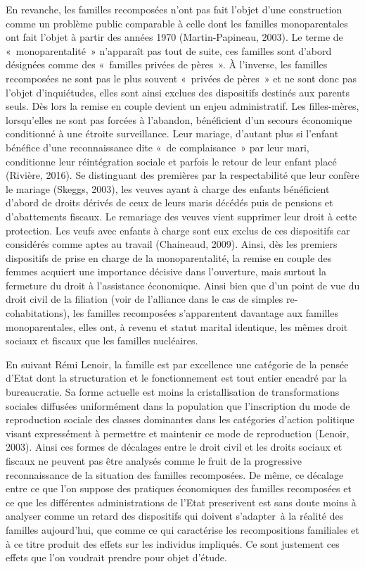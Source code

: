 \documentclass[
  12pt,
]{book}
\begin{document}
En revanche, les familles recomposées n'ont pas fait l'objet d'une
construction comme un problème public comparable à celle dont les
familles monoparentales ont fait l'objet à partir des années 1970
(Martin-Papineau, 2003). Le terme de «~monoparentalité~» n'apparaît pas
tout de suite, ces familles sont d'abord désignées comme des «~familles
privées de pères~». À l'inverse, les familles recomposées ne sont pas le
plus souvent «~privées de pères~» et ne sont donc pas l'objet
d'inquiétudes, elles sont ainsi exclues des dispositifs destinés aux
parents seuls. Dès lors la remise en couple devient un enjeu
administratif. Les filles-mères, lorsqu'elles ne sont pas forcées à
l'abandon, bénéficient d'un secours économique conditionné à une étroite
surveillance. Leur mariage, d'autant plus si l'enfant bénéfice d'une
reconnaissance dite «~de complaisance~» par leur mari, conditionne leur
réintégration sociale et parfois le retour de leur enfant placé
(Rivière, 2016). Se distinguant des premières par la respectabilité que
leur confère le mariage (Skeggs, 2003), les veuves ayant à charge des
enfants bénéficient d'abord de droits dérivés de ceux de leurs maris
décédés puis de pensions et d'abattements fiscaux. Le remariage des
veuves vient supprimer leur droit à cette protection. Les veufs avec
enfants à charge sont eux exclus de ces dispositifs car considérés comme
aptes au travail (Chaineaud, 2009). Ainsi, dès les premiers dispositifs
de prise en charge de la monoparentalité, la remise en couple des femmes
acquiert une importance décisive dans l'ouverture, mais surtout la
fermeture du droit à l'assistance économique. Ainsi bien que d'un point
de vue du droit civil de la filiation (voir de l'alliance dans le cas de
simples re-cohabitations), les familles recomposées s'apparentent
davantage aux familles monoparentales, elles ont, à revenu et statut
marital identique, les mêmes droit sociaux et fiscaux que les familles
nucléaires.

En suivant Rémi Lenoir, la famille est par excellence une catégorie de
la pensée d'Etat dont la structuration et le fonctionnement est tout
entier encadré par la bureaucratie. Sa forme actuelle est moins la
cristallisation de transformations sociales diffusées uniformément dans
la population que l'inscription du mode de reproduction sociale des
classes dominantes dans les catégories d'action politique visant
expressément à permettre et maintenir ce mode de reproduction (Lenoir,
2003). Ainsi ces formes de décalages entre le droit civil et les droits
sociaux et fiscaux ne peuvent pas être analysés comme le fruit de la
progressive reconnaissance de la situation des familles recomposées. De
même, ce décalage entre ce que l'on suppose des pratiques économiques
des familles recomposées et ce que les différentes administrations de
l'Etat prescrivent est sans doute moins à analyser comme un retard des
dispositifs qui doivent s'adapter~à la réalité des familles aujourd'hui,
que comme ce qui caractérise les recompositions familiales et à ce titre
produit des effets sur les individus impliqués. Ce sont justement ces
effets que l'on voudrait prendre pour objet d'étude.
\end{document}
